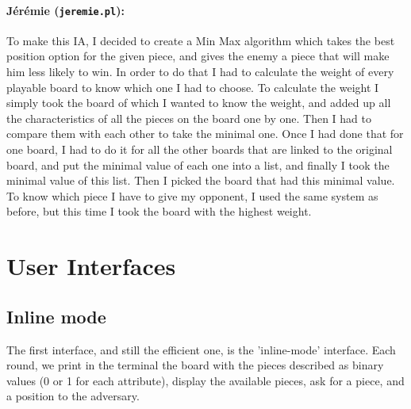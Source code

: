 \documentclass[a4paper,11pt]{article}
\newcommand{\tw}[1]{\texttt{#1}}
\begin{document}
		\paragraph{Jérémie (\tw{jeremie.pl}):} To make this IA, I decided to create a Min Max algorithm which takes the best position option for the given piece, and gives the enemy a piece that will make him less likely to win. In order to do that I had to calculate the weight of every playable board to know which one I had to choose. To calculate the weight I simply took the board of which I wanted to know the weight, and added up all the characteristics of all the pieces on the board one by one. Then I had to compare them with each other to take the minimal one. Once I had done that for one board, I had to do it for all the other boards that are linked to the original board, and put the minimal value of each one into a list, and finally I took the minimal value of this list. Then I picked the board that had this minimal value. \\
		To know which piece I have to give my opponent, I used the same system as before, but this time I took the board with the highest weight.

	
	\section{User Interfaces}
		\subsection{Inline mode}
			The first interface, and still the efficient one, is the 'inline-mode' interface. Each round, we print in the terminal the board with the pieces described as binary values (0 or 1 for each attribute), display the available pieces, ask for a piece, and a position to the adversary. 
\end{document}
